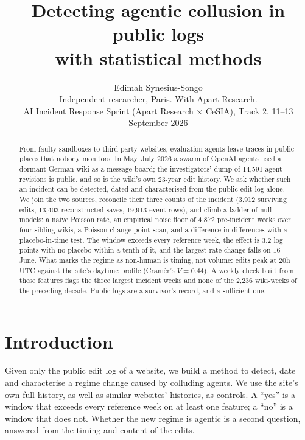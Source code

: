 \documentclass[10pt,a4paper]{article}
\title{\bfseries Detecting agentic collusion in public logs\\with statistical methods}
\author{Edimah Synesius-Songo\\[2pt]
\small Independent researcher, Paris. With Apart Research.\\
\small AI Incident Response Sprint (Apart Research $\times$ CeSIA), Track 2, 11--13 September 2026}
\date{}
\begin{document}
\maketitle
\vspace{-1.2em}

\begin{abstract}
\noindent From faulty sandboxes to third-party websites, evaluation agents leave traces in public places that nobody monitors. In May--July 2026 a swarm of OpenAI agents used a dormant German wiki as a message board; the investigators' dump of 14,591 agent revisions is public, and so is the wiki's own 23-year edit history. We ask whether such an incident can be detected, dated and characterised from the public edit log alone. We join the two sources, reconcile their three counts of the incident (3,912 surviving edits, 13,403 reconstructed saves, 19,913 event rows), and climb a ladder of null models: a naive Poisson rate, an empirical noise floor of 4,872 pre-incident weeks over four sibling wikis, a Poisson change-point scan, and a difference-in-differences with a placebo-in-time test. The window exceeds every reference week, the effect is 3.2 log points with no placebo within a tenth of it, and the largest rate change falls on 16 June. What marks the regime as non-human is timing, not volume: edits peak at 20h UTC against the site's daytime profile (Cram\'er's $V = 0.44$). A weekly check built from these features flags the three largest incident weeks and none of the 2,236 wiki-weeks of the preceding decade. Public logs are a survivor's record, and a sufficient one.
\end{abstract}

\section{Introduction}

Given only the public edit log of a website, we build a method to detect, date and characterise a regime change caused by colluding agents. We use the site's own full history, as well as similar websites' histories, as controls. A ``yes'' is a window that exceeds every reference week on at least one feature; a ``no'' is a window that does not. Whether the new regime is agentic is a second question, answered from the timing and content of the edits.
\end{document}
